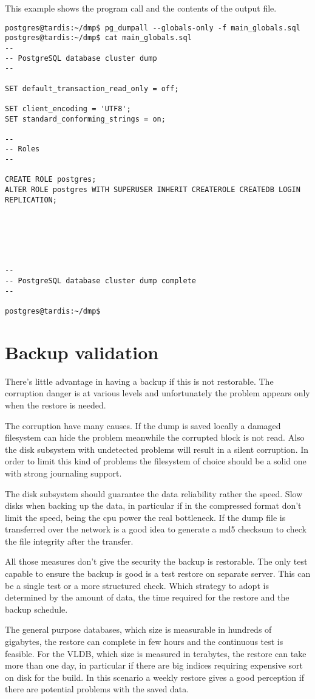 This example shows the program call and the contents of the output file.
\begin{verbatim}
postgres@tardis:~/dmp$ pg_dumpall --globals-only -f main_globals.sql
postgres@tardis:~/dmp$ cat main_globals.sql 
--
-- PostgreSQL database cluster dump
--

SET default_transaction_read_only = off;

SET client_encoding = 'UTF8';
SET standard_conforming_strings = on;

--
-- Roles
--

CREATE ROLE postgres;
ALTER ROLE postgres WITH SUPERUSER INHERIT CREATEROLE CREATEDB LOGIN REPLICATION;






--
-- PostgreSQL database cluster dump complete
--

postgres@tardis:~/dmp$ 

\end{verbatim}


\section{Backup validation}
There's little advantage in having a backup if this is not restorable. The corruption danger is at 
various levels and unfortunately the problem appears only when the restore is needed.\newline 

The corruption have many causes. If the dump is saved locally a damaged filesystem can hide the 
problem meanwhile the corrupted block is not read. Also the disk subsystem with undetected problems 
will result in a silent corruption. In order to limit this kind of problems the filesystem of 
choice should be a solid one with strong journaling support.\newline

The disk subsystem should guarantee the data reliability rather the speed. Slow disks when backing 
up the data, in particular if in the compressed format don't limit the speed, being the cpu power 
the real bottleneck.\newline
If the dump file is transferred over the network is a good idea to generate a md5 checksum to 
check the file integrity after the transfer.\newline

All those measures don't give the security the backup is restorable. The only test capable to 
ensure the backup is good is a test restore on separate server. This can be a single test or a more 
structured check. Which strategy to adopt is determined by the amount of data, the time required 
for the restore and the backup schedule.\newline

The general purpose databases, which size is measurable in hundreds of gigabytes, the restore can 
complete in few hours and the continuous test is feasible. For the VLDB, which size is measured in 
terabytes, the restore can take more than one day, in particular if there are big indices requiring 
expensive sort on disk for the build. In this scenario a weekly restore gives a good perception if 
there are potential problems with the saved data. 